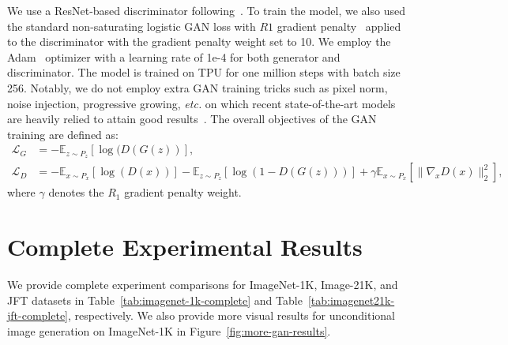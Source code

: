 \documentclass[runningheads]{llncs}
\def\etc{\emph{etc.} } \def\vs{\emph{vs.} }
\begin{document}
We use a ResNet-based discriminator following~\cite{karras2020analyzing}.
To train the model, we also used the standard non-saturating logistic GAN loss with $R1$ gradient penalty~\cite{mescheder2018training} applied to the discriminator with the gradient penalty weight set to 10.
We employ the Adam~\cite{kingma2014adam} optimizer with a learning rate of 1e-4 for both generator and discriminator.
The model is trained on TPU for one million steps with batch size 256.
Notably, we do not employ extra GAN training tricks such as pixel norm, noise injection, progressive growing, \etc on which recent state-of-the-art models are heavily relied to attain good results~\cite{karras2017progressive,karras2020analyzing}.
The overall objectives of the GAN training are defined as:
\begin{align}
\label{eq:objective-gan}
\mathcal{L}_G& = -\mathbb{E}_{z\sim P_z}[\log(D(G(z))],\\
\mathcal{L}_D& = -\mathbb{E}_{x\sim P_x}[\log(D(x))]-\mathbb{E}_{z\sim P_z}[\log(1-D(G(z)))]+\gamma\mathbb{E}_{x\sim P_x}[\|\nabla_xD(x) \|_2^2],
\end{align}
where $\gamma$ denotes the $R_1$ gradient penalty weight.



\section{Complete Experimental Results}
\label{sec:complete-experimental-results}

We provide complete experiment comparisons for ImageNet-1K, Image-21K, and JFT datasets in Table~\ref{tab:imagenet-1k-complete} and Table~\ref{tab:imagenet21k-jft-complete}, respectively. We also provide more visual results for unconditional image generation on ImageNet-1K in Figure~\ref{fig:more-gan-results}.
\end{document}
